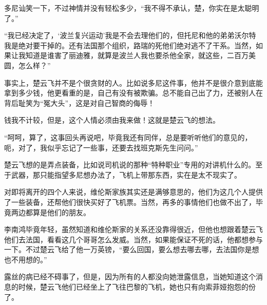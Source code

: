 多尼讪笑一下，不过神情并没有轻松多少，“我不得不承认，楚，你实在是太聪明了。”

“我已经决定了，‘波兰复兴运动’我是不会去理他们的，但托尼和他的弟弟沃尔特我是绝对要干掉的。还有法国那个组织，路瑞的死他们绝对逃不了干系。当然，如果让我知道是谁害了丽迪雅，就算是波兰人我也要杀他全家，就这些，二百万美圆，怎么样？”

事实上，楚云飞并不是个很贪财的人。比如说多尼这件事，他并不是很介意到底能拿到多少钱，他更看重的是，自己有没有被欺骗。总不能自己出了力，还被别人在背后耻笑为“冤大头”，这是对自己智商的侮辱！

钱我不计较，但是，这个人情必须由我来做！这就是楚云飞的想法。

“呵呵，算了，这事回头再说吧，毕竟我还有同伴，总是要听听他们的意见的，呃，对了，我似乎忘记了一些事，还要去找班克斯先生问问。”

楚云飞想的是弄点装备，比如说司机说的那种“特种职业”专用的对讲机什么的。至于武器，那只能指望多尼想办法了，飞机上带那东西，实在是太不现实了。

对即将离开的四个人来说，维伦斯家族其实还是满够意思的，他们为这几个人提供了一些装备，还帮他们很快买好了飞机票。当然，再多的事情他们也做不出了，毕竟两边都算是他们的朋友。

李南鸿毕竟年轻，虽然知道和维伦斯家的关系还没靠得很近，但他也想跟着楚云飞他们去法国，看看这几个哥哥怎么发威。当然，如果能保证不死的话，他都想参与一下。不过楚云飞给了他一万英镑，“要么回国，要么想去哪去哪，去法国你是想也不用想的。”

露丝的病已经不碍事了，但是，因为所有的人都没向她泄露信息，当她知道这个消息的时候，楚云飞他们已经坐上了飞往巴黎的飞机，她也只有向索菲娅抱怨的份了。

